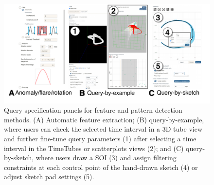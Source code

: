 \begin{figure}[t]
    \begin{minipage}{\columnwidth}
        \begin{center}
            \includegraphics[width=.99\linewidth]{vgtc_journal_latex/figures/QuerySpecificationPanel.pdf}
        \end{center}
        \begin{minipage}{\columnwidth}
        \caption{Query specification panels for feature and pattern detection methods. (A) Automatic feature extraction; (B) query-by-example, where users can check the selected time interval in a 3D tube view and further fine-tune query parameters (1) after selecting a time interval in the TimeTubes or scatterplots views (2);
         and (C) query-by-sketch, where users draw a SOI (3) and assign filtering constraints at each control point of the hand-drawn sketch (4) or adjust sketch pad settings (5).}
        \label{fig:querySpecificationPanel}
        \end{minipage}
    \end{minipage}
\end{figure}
